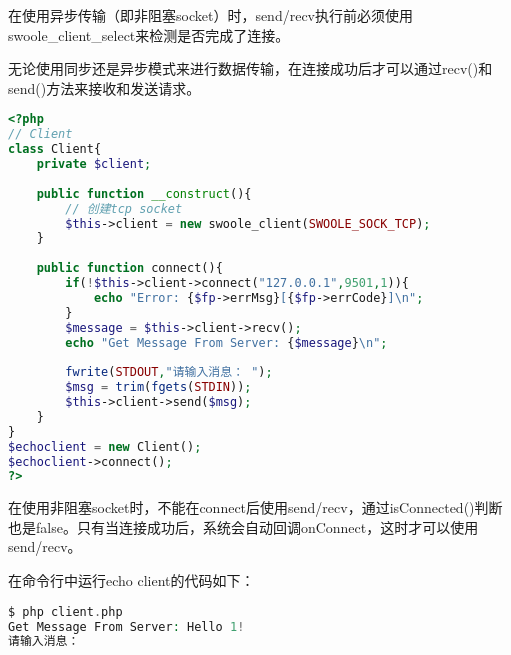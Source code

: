 在使用异步传输（即非阻塞socket）时，send/recv执行前必须使用swoole\_client\_select来检测是否完成了连接。

无论使用同步还是异步模式来进行数据传输，在连接成功后才可以通过recv()和send()方法来接收和发送请求。



\begin{lstlisting}[language=PHP]
<?php
// Client
class Client{
	private $client;
	
	public function __construct(){
		// 创建tcp socket
		$this->client = new swoole_client(SWOOLE_SOCK_TCP);
	}
	
	public function connect(){
		if(!$this->client->connect("127.0.0.1",9501,1)){
			echo "Error: {$fp->errMsg}[{$fp->errCode}]\n";
		}
		$message = $this->client->recv();
		echo "Get Message From Server: {$message}\n";
		
		fwrite(STDOUT,"请输入消息： ");
		$msg = trim(fgets(STDIN));
		$this->client->send($msg);
	}
}
$echoclient = new Client();
$echoclient->connect();
?>
\end{lstlisting}


在使用非阻塞socket时，不能在connect后使用send/recv，通过isConnected()判断也是false。只有当连接成功后，系统会自动回调onConnect，这时才可以使用send/recv。

在命令行中运行echo client的代码如下：



\begin{lstlisting}[language=PHP]
$ php client.php
Get Message From Server: Hello 1!
请输入消息：
\end{lstlisting}




\begin{lstlisting}[language=PHP]

\end{lstlisting}




\begin{lstlisting}[language=PHP]

\end{lstlisting}




\begin{lstlisting}[language=PHP]

\end{lstlisting}




\begin{lstlisting}[language=PHP]

\end{lstlisting}






